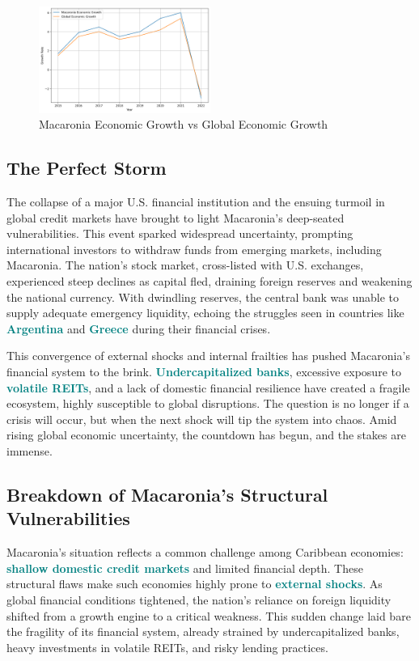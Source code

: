 \begin{figure}[h]
     \centering
     \includegraphics[width=0.5\textwidth]{growth.png}
     \caption{Macaronia Economic Growth vs Global Economic Growth}
     \label{fig:graph_1}
\end{figure}
\subsection*{The Perfect Storm}  

The collapse of a major U.S. financial institution and the ensuing turmoil in global credit markets have brought to light Macaronia's deep-seated vulnerabilities. 
This event sparked widespread uncertainty, prompting international investors to withdraw funds from emerging markets, including Macaronia. The nation’s stock market, cross-listed with U.S. exchanges,
experienced steep declines as capital fled, draining foreign reserves and weakening the national currency. With dwindling reserves, the central bank was unable to supply adequate emergency liquidity,
echoing the struggles seen in countries like \textbf{\textcolor{teal}{Argentina}} and \textbf{\textcolor{teal}{Greece}} during their financial crises.  \textcolor{orange}{\cite{IMF2023WEO}} %

This convergence of external shocks and internal frailties has pushed Macaronia’s financial system to the brink. \textbf{\textcolor{teal}{Undercapitalized banks}}, 
excessive exposure to \textbf{\textcolor{teal}{volatile REITs}}, and a lack of domestic financial resilience have created a fragile ecosystem, highly susceptible to global disruptions. 
The question is no longer if a crisis will occur, but when the next shock will tip the system into chaos. Amid rising global economic uncertainty, the countdown has begun, and the stakes are immense.  



\subsection*{Breakdown of Macaronia's Structural Vulnerabilities}  
Macaronia’s situation reflects a common challenge among Caribbean economies: \textbf{\textcolor{teal}{shallow domestic credit markets}} and limited financial depth.
These structural flaws make such economies highly prone to \textbf{\textcolor{teal}{external shocks}}. As global financial conditions tightened, the nation’s reliance on foreign liquidity 
shifted from a growth engine to a critical weakness. This sudden change laid bare the fragility of its financial system, already strained by undercapitalized banks, heavy investments in volatile REITs, 
and risky lending practices.  \textcolor{orange}{\cite{UNCTAD2023FDI}}



